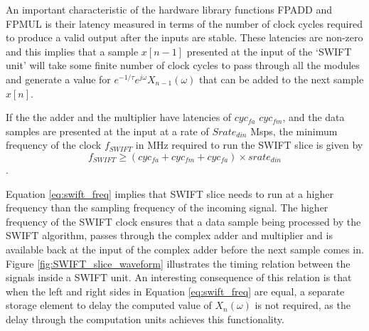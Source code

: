 An important characteristic of the hardware library functions FPADD and FPMUL is their latency measured in terms of the number of clock cycles required to produce a valid output after the inputs are stable. These latencies are non-zero and this implies that a sample $x[n-1]$ presented at the input of the `SWIFT unit' will take some finite number of clock cycles to pass through all the modules and generate a value for $e^{-1/\tau}e^{j\omega}X_{n-1}(\omega)$ that can be added to the next sample $x[n]$.

If the the adder and the multiplier have latencies of $cyc_{fa}$ $cyc_{fm}$, and the data samples are presented at the input at a rate of $Srate_{din}$ Msps, the minimum frequency of the clock $f_{SWIFT}$ in MHz required to run the SWIFT slice is given by
\begin{equation}
\label{eq:swift_freq}
f_{SWIFT} \geq (cyc_{fa} + cyc_{fm} + cyc_{fa}) \times srate_{din} 
\end{equation}. 

Equation \ref{eq:swift_freq} implies that SWIFT slice needs to run at a higher frequency than the sampling frequency of the incoming signal. The higher frequency of the SWIFT clock ensures that a data sample being processed by the SWIFT algorithm, passes through the complex adder and multiplier and is available back at the input of the complex adder before the next sample comes in. Figure \ref{fig:SWIFT_slice_waveform} illustrates the timing relation between the signals inside a SWIFT unit. An interesting consequence of this relation is that when the left and right sides in Equation \ref{eq:swift_freq} are equal, a separate storage element to delay the computed value of $X_n(\omega)$ is not required, as the delay through the computation units achieves this functionality.

